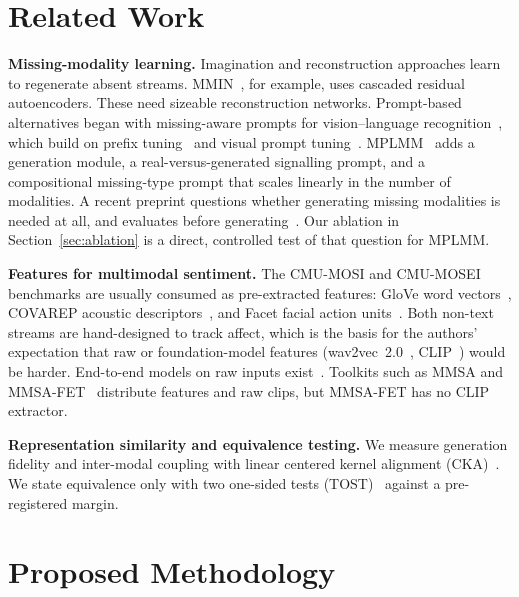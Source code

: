 \documentclass[lettersize,journal]{IEEEtran}
\begin{document}
\section{Related Work}
\textbf{Missing-modality learning.} Imagination and reconstruction approaches learn to regenerate absent streams. MMIN~\cite{zhao2021mmin}, for example, uses cascaded residual autoencoders. These need sizeable reconstruction networks. Prompt-based alternatives began with missing-aware prompts for vision--language recognition~\cite{lee2023missingprompts}, which build on prefix tuning~\cite{li2021prefix} and visual prompt tuning~\cite{jia2022vpt}. MPLMM~\cite{guo2024mplmm} adds a generation module, a real-versus-generated signalling prompt, and a compositional missing-type prompt that scales linearly in the number of modalities. A recent preprint questions whether generating missing modalities is needed at all, and evaluates before generating~\cite{evalbeforegen2026}. Our ablation in Section~\ref{sec:ablation} is a direct, controlled test of that question for MPLMM.

\textbf{Features for multimodal sentiment.} The CMU-MOSI and CMU-MOSEI~\cite{zadeh2018mosei} benchmarks are usually consumed as pre-extracted features: GloVe word vectors~\cite{pennington2014glove}, COVAREP acoustic descriptors~\cite{degottex2014covarep}, and Facet facial action units~\cite{ekman1978facs}. Both non-text streams are hand-designed to track affect, which is the basis for the authors' expectation that raw or foundation-model features (wav2vec~2.0~\cite{baevski2020wav2vec}, CLIP~\cite{radford2021clip}) would be harder. End-to-end models on raw inputs exist~\cite{dai2021sparse}. Toolkits such as MMSA and MMSA-FET~\cite{mao2022msena} distribute features and raw clips, but MMSA-FET has no CLIP extractor.

\textbf{Representation similarity and equivalence testing.} We measure generation fidelity and inter-modal coupling with linear centered kernel alignment (CKA)~\cite{kornblith2019cka}. We state equivalence only with two one-sided tests (TOST)~\cite{schuirmann1987tost} against a pre-registered margin.

\section{Proposed Methodology}
\end{document}
